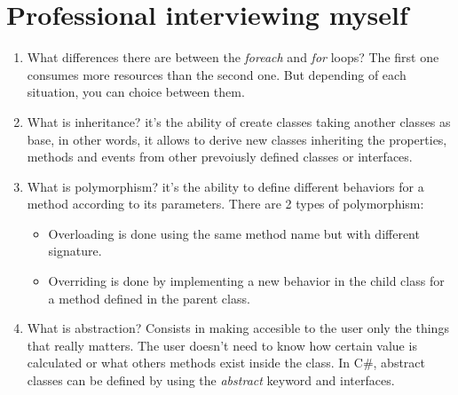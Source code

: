 \section{Professional interviewing myself}
\begin{multicols}{2}

\begin{enumerate}

\item What differences there are between the \emph{foreach} and \emph{for} loops? The first one consumes more resources than the second one. But depending of each situation, you can choice between them.

\item What is inheritance? it's the ability of create classes taking another classes as base, in other words, it allows to derive new classes inheriting the properties, methods and events from other prevoiusly defined classes or interfaces.

\item What is polymorphism? it's the ability to define different behaviors for a method according to its parameters. There are 2 types of polymorphism:
\begin{itemize}
\item Overloading is done using the same method name but with different signature.
\item Overriding is done by implementing a new behavior in the child class for a method defined in the parent class.
\end{itemize}

\item What is abstraction? Consists in making accesible to the user only the things that really matters. The user doesn't need to know how certain value is calculated or what others methods exist inside the class. In C\#, abstract classes can be defined by using the \emph{abstract} keyword and interfaces.


\end{enumerate}
\end{multicols}
